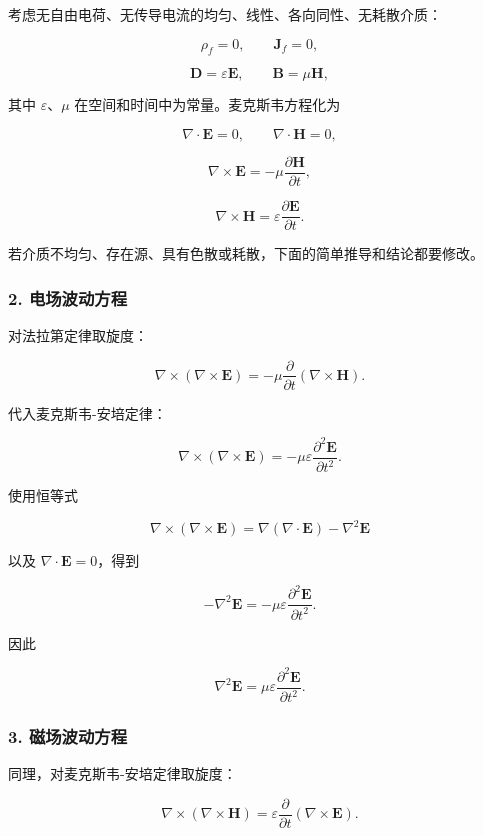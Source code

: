 考虑无自由电荷、无传导电流的均匀、线性、各向同性、无耗散介质：

\[
\rho_f=0,
\qquad
\mathbf J_f=0,
\]

\[
\mathbf D=\varepsilon\mathbf E,
\qquad
\mathbf B=\mu\mathbf H,
\]

其中 \(\varepsilon\)、\(\mu\) 在空间和时间中为常量。麦克斯韦方程化为

\[
\nabla\cdot\mathbf E=0,
\qquad
\nabla\cdot\mathbf H=0,
\]

\[
\nabla\times\mathbf E
=-\mu\frac{\partial\mathbf H}{\partial t},
\]

\[
\nabla\times\mathbf H
=\varepsilon\frac{\partial\mathbf E}{\partial t}.
\]

若介质不均匀、存在源、具有色散或耗散，下面的简单推导和结论都要修改。

\subsubsection{2.
电场波动方程}\label{m7:ux7535ux573aux6ce2ux52a8ux65b9ux7a0b}

对法拉第定律取旋度：

\[
\nabla\times(\nabla\times\mathbf E)
=-\mu\frac{\partial}{\partial t}
(\nabla\times\mathbf H).
\]

代入麦克斯韦-安培定律：

\[
\nabla\times(\nabla\times\mathbf E)
=-\mu\varepsilon
\frac{\partial^2\mathbf E}{\partial t^2}.
\]

使用恒等式

\[
\nabla\times(\nabla\times\mathbf E)
=\nabla(\nabla\cdot\mathbf E)-\nabla^2\mathbf E
\]

以及 \(\nabla\cdot\mathbf E=0\)，得到

\[
-\nabla^2\mathbf E
=-\mu\varepsilon
\frac{\partial^2\mathbf E}{\partial t^2}.
\]

因此

\[
\boxed{
\nabla^2\mathbf E
=\mu\varepsilon
\frac{\partial^2\mathbf E}{\partial t^2}
}.
\]

\subsubsection{3.
磁场波动方程}\label{m7:ux78c1ux573aux6ce2ux52a8ux65b9ux7a0b}

同理，对麦克斯韦-安培定律取旋度：

\[
\nabla\times(\nabla\times\mathbf H)
=\varepsilon\frac{\partial}{\partial t}
(\nabla\times\mathbf E).
\]

